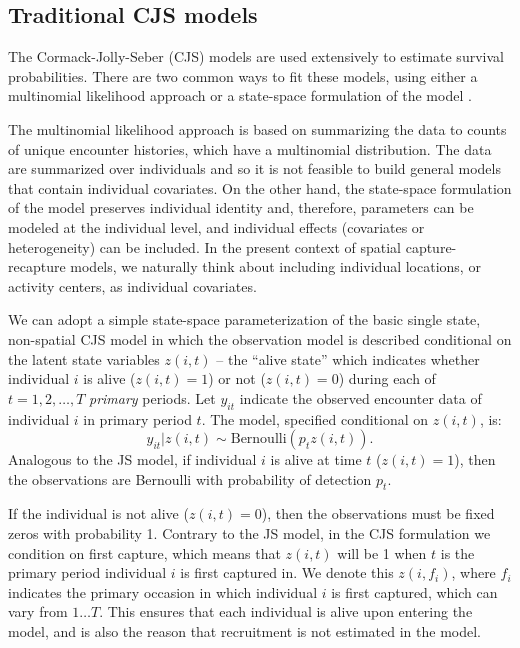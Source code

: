 \subsection{Traditional CJS models}
The Cormack-Jolly-Seber (CJS) models are used extensively to estimate
survival probabilities.  There are two common ways to fit these
models, using either a multinomial likelihood approach
\citep{lebreton_etal:1992} or a state-space formulation of the model
\citep{gimenez:2007, royle:2008}.

The multinomial likelihood approach is based on summarizing the data
to counts of unique encounter histories, which have a multinomial
distribution. The data are summarized over individuals and so it is
not feasible to build general models that contain individual
covariates. On the other hand, the state-space formulation of the
model preserves individual identity and, therefore, parameters can be 
modeled at the individual level, and individual effects (covariates or
heterogeneity) can be included. In the present context of spatial
capture-recapture models, we naturally think about including
individual locations, or activity centers, as individual covariates. 


We can adopt a simple state-space parameterization of the
basic single state, non-spatial CJS model in which the observation model is
described conditional on the latent state variables $z(i,t)$ -- the
``alive state'' which indicates whether individual $i$ is
alive ($z(i,t)=1$) or not ($z(i,t)=0$) during each of $t=1,2,\ldots,T$
{\it primary} periods.
Let $y_{it}$ indicate the observed
encounter data of individual $i$ in primary period $t$. The
model, specified conditional on $z(i,t)$, is:
\[
  y_{it}|z(i,t) \sim \mbox{Bernoulli}(p_{t}z(i,t)).
\]
Analogous to the JS model, if individual $i$ is alive at time $t$
($z(i,t)=1$), then the observations are Bernoulli with probability of
detection $p_t$.  

If the individual is not alive ($z(i,t)=0$), then the observations
must be fixed zeros with probability 1.  Contrary to the JS model, in
the CJS formulation we condition on first capture, which means that
$z(i,t)$ will be 1 when $t$ is the primary period individual $i$ is
first captured in.  We denote this $z(i, f_i)$, where $f_i$ indicates
the primary occasion in which individual $i$ is first captured, which
can vary from $1 \dots T$.  This ensures that each individual is alive
upon entering the model, and is also the reason that recruitment is
not estimated in the model.


